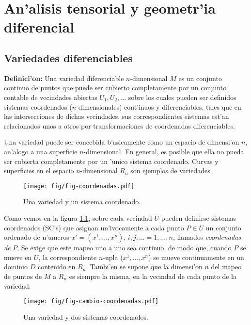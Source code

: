 \chapter{An'alisis tensorial y geometr'ia diferencial}\label{cap:tensores}

\section{Variedades diferenciables}

\textbf{Definici'on:} Una variedad diferenciable $n$-dimensional $M$ es
un conjunto continuo de puntos que puede ser cubierto completamente por un
conjunto contable de vecindades abiertas $U_1, U_2,\dots$ sobre los cuales pueden ser definidos sistemas coordenados ($n$-dimensionales) cont'inuos y diferenciables, tales que en las intersecciones de dichas vecindades, sus correspondientes sistemas est'an relacionados unos a otros por transformaciones de coordenadas diferenciables.

Una variedad puede ser concebida b'asicamente como un espacio de
dimensi'on $n$, an'alogo a una superficie $n$-dimensional. En general,
es posible que ella no pueda ser cubierta completamente por un 'unico sistema coordenado.
Curvas y superficies en el espacio $n$-dimensional $R_n$ son ejemplos de variedades.
\begin{center}
\begin{figure}[H]
\centerline{\texttt{[image: fig/fig-coordenadas.pdf]}}
\caption{Una variedad y un sistema coordenado.}
\label{1-1}
\end{figure}
\end{center}

Como vemos en la figura \ref{1-1}, sobre cada vecindad $U$ pueden definirse sistemas coordenados (SC's) que asignan un'ivocamente a cada punto $P\in U$
un conjunto ordenado de n'umeros $x^i=(x^1,\dots ,x^n)$,
$i,j,\dots =1,\dots ,n$, llamados \textit{coordenadas de} $P$. Se exige que este mapeo uno a
uno sea continuo, de modo que, cuando $P$ se mueve en $U$, la correspondiente $n$-upla
($x^1,\dots ,x^n$) se mueve continuamente en un dominio $D$ contenido en $R_n$. Tambi'en se supone que la dimensi'on $n$ del mapeo de puntos de $M$ a $R_n$ es siempre la misma, en la vecindad de cada punto de la variedad.
\begin{center}
\begin{figure}[H]
\centerline{\texttt{[image: fig/fig-cambio-coordenadas.pdf]}}
\caption{Una variedad y dos sistemas coordenados.}
\label{2-1}
\end{figure}
\end{center}

